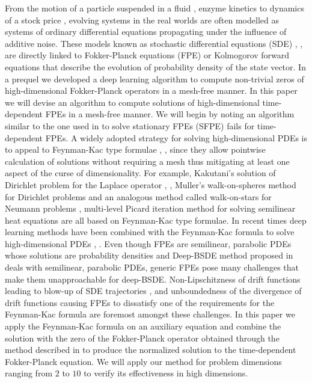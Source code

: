 From the motion of a particle suspended in a fluid \cite{karatzas1991brownian},  enzyme kinetics \cite{allen2010introduction} to dynamics of a stock price \cite{karoui1997non}, \cite{delong2013backward} evolving systems in the real worlds are often modelled as systems of ordinary differential equations propagating under the influence of additive noise. These models known as stochastic differential equations (SDE) \cite{oksendal2003stochastic}, \cite{gardiner2009stochastic}, \cite{strauss2017hitch} are directly linked to Fokker-Planck equations (FPE) \cite{risken1996fokker} or Kolmogorov forward equations that describe the evolution of probability density of the state vector. In a prequel \cite{mandal2023learning} we developed a deep learning algorithm to compute non-trivial zeros of high-dimensional Fokker-Planck operators in a mesh-free manner. In this paper we will devise an algorithm to compute solutions of high-dimensional time-dependent FPEs in a mesh-free manner. We will begin by noting an algorithm similar to the one used in \cite{mandal2023learning} to solve stationary FPEs (SFPE) fails for time-dependent FPEs. A widely adopted strategy for solving high-dimensional PDEs is to appeal to Feynman-Kac type formulae \cite{del2004feynman}, \cite{jefferies2013evolution}, since they allow pointwise calculation of solutions without requiring a mesh thus mitigating at least one aspect of the curse of dimensionality. For example, Kakutani's solution of Dirichlet problem for the Laplace operator \cite{kakutani1944131}, \cite{kakutani1944143}, Muller's walk-on-spheres method for Dirichlet problems \cite{muller1956some} and an analogous method called walk-on-stars for Neumann problems \cite{sawhney2023walk}, multi-level Picard iteration method for solving semilinear heat equations \cite{hutzenthaler2021multilevel} are all based on Feynman-Kac type formulae. In recent times  deep learning methods have been combined with the Feynman-Kac formula to solve high-dimensional PDEs \cite{han2018solving}, \cite{blechschmidt2021three}. Even though FPEs are semilinear, parabolic PDEs whose solutions are probability densities and Deep-BSDE method proposed in \cite{han2018solving} deals with semilinear, parabolic PDEs, generic FPEs pose many challenges that make them unapproachable for deep-BSDE. Non-Lipschitzness of drift functions leading to blow-up of SDE trajectories \cite{chow2014almost}, \cite{li2011lack} and unboundedness of the divergence of drift functions causing FPEs to dissatisfy one of the requirements for the Feynman-Kac formula are foremost amongst these challenges. In this paper we apply the Feynman-Kac formula on an auxiliary equation and combine the solution with the zero of the Fokker-Planck operator obtained through the method described in \cite{mandal2023learning} to produce the normalized solution to the time-dependent Fokker-Planck equation.  We will apply our method for problem dimensions ranging from $2$ to $10$ to verify its effectiveness in high dimensions.


